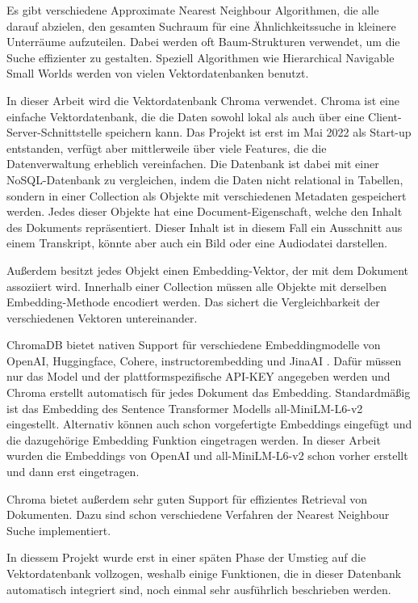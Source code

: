 Es gibt verschiedene Approximate Nearest Neighbour Algorithmen, die alle darauf abzielen, den gesamten Suchraum für eine Ähnlichkeitssuche in kleinere Unterräume aufzuteilen.
Dabei werden oft Baum-Strukturen verwendet, um die Suche effizienter zu gestalten.
Speziell Algorithmen wie Hierarchical Navigable Small Worlds werden von vielen Vektordatenbanken benutzt.

In dieser Arbeit wird die Vektordatenbank Chroma verwendet. 
Chroma ist eine einfache Vektordatenbank, die die Daten sowohl lokal als auch über eine Client-Server-Schnittstelle speichern kann.
Das Projekt ist erst im Mai 2022 als Start-up entstanden, verfügt aber mittlerweile über viele Features, die die Datenverwaltung erheblich vereinfachen.
Die Datenbank ist dabei mit einer NoSQL-Datenbank zu vergleichen, indem die Daten nicht relational in Tabellen, sondern in einer Collection als Objekte mit verschiedenen Metadaten gespeichert werden.
Jedes dieser Objekte hat eine Document-Eigenschaft, welche den Inhalt des Dokuments repräsentiert.
Dieser Inhalt ist in diesem Fall ein Ausschnitt aus einem Transkript, könnte aber auch ein Bild oder eine Audiodatei darstellen.

Außerdem besitzt jedes Objekt einen Embedding-Vektor, der mit dem Dokument assoziiert wird. 
Innerhalb einer Collection müssen alle Objekte mit derselben Embedding-Methode encodiert werden.
Das sichert die Vergleichbarkeit der verschiedenen Vektoren untereinander.

ChromaDB bietet nativen Support für verschiedene Embeddingmodelle von OpenAI, Huggingface, Cohere, instructorembedding und JinaAI \cite{chroma}.
Dafür müssen nur das Model und der plattformspezifische API-KEY angegeben werden und Chroma erstellt automatisch für jedes Dokument das Embedding.
Standardmäßig ist das Embedding des Sentence Transformer Modells all-MiniLM-L6-v2 eingestellt.
Alternativ können auch schon vorgefertigte Embeddings eingefügt und die dazugehörige Embedding Funktion eingetragen werden.
In dieser Arbeit wurden die Embeddings von OpenAI und all-MiniLM-L6-v2 schon vorher erstellt und dann erst eingetragen.

Chroma bietet außerdem sehr guten Support für effizientes Retrieval von Dokumenten.
Dazu sind schon verschiedene Verfahren der Nearest Neighbour Suche implementiert.
 

In diessem Projekt wurde erst in einer späten Phase der Umstieg auf die Vektordatenbank vollzogen, weshalb einige Funktionen, die in dieser Datenbank automatisch integriert sind, noch einmal sehr ausführlich beschrieben werden.


